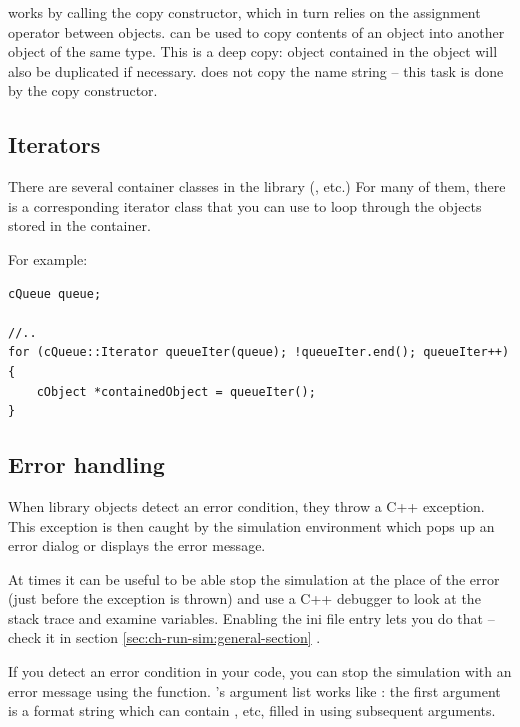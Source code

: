  works by calling the copy constructor, which in
turn relies on the assignment operator between objects.
 can be used to copy contents of an object into
another object of the same type. This is a deep copy: object
contained in the object will also be duplicated if necessary.
 does not copy the name string -- this task is done
by the copy constructor.


\subsection{Iterators}


There are several container classes in the library (,
 etc.) For many of them, there is a corresponding
iterator class that you can use to loop through the objects stored in
the container.

For example:

\begin{verbatim}
cQueue queue;

//..
for (cQueue::Iterator queueIter(queue); !queueIter.end(); queueIter++)
{
    cObject *containedObject = queueIter();
}
\end{verbatim}



\subsection{Error handling}


When library objects detect an error condition, they throw a C++ exception.
This exception is then caught by the simulation environment which pops up
an error dialog or displays the error message.

At times it can be useful to be able stop the simulation at the place of the error
(just before the exception is thrown) and use a C++ debugger to look
at the stack trace and examine variables. Enabling the 
ini file entry lets you do that -- check it in section
\ref{sec:ch-run-sim:general-section}  .

If you detect an error condition in your code, you can stop the
simulation with an error message using the  function.
's argument list works like : the
first argument is a format string which can contain ,  etc,
filled in using subsequent arguments.

